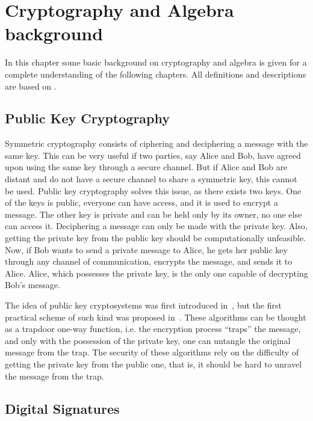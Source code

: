 \documentclass{ufsctex/ufsctex}
\begin{document}
\chapter{Cryptography and Algebra background}

In this chapter some basic background on cryptography and algebra is given for
a complete understanding of the following chapters. All definitions and
descriptions are based on \cite{stinson2005cryptography}.

\section{Public Key Cryptography}

Symmetric cryptography consists of ciphering and deciphering a message with the
same key. This can be very useful if two parties, say Alice and Bob, have
agreed upon using the same key through a secure channel. But if Alice and Bob
are distant and do not have a secure channel to share a symmetric key, this
cannot be used. Public key cryptography solves this issue, as there exists two
keys. One of the keys is public, everyone can have access, and it is used to
encrypt a message. The other key is private and can be held only by its owner,
no one else can access it. Deciphering a message can only be made with the
private key. Also, getting the private key from the public key should be
computationally unfeasible. Now, if Bob wants to send a private message to
Alice, he gets her public key through any channel of communication, encrypts
the message, and sends it to Alice. Alice, which possesses the private key, is
the only one capable of decrypting Bob's message.

The idea of public key cryptosystems was first introduced
in~\cite{diffie1976new}, but the first practical scheme of such kind was
proposed in~\cite{rivest1977digital}. These algorithms can be thought as a
trapdoor one-way function, i.e. the encryption process ``traps'' the message,
and only with the possession of the private key, one can untangle the original
message from the trap. The security of these algorithms rely on the difficulty
of getting the private key from the public one, that is, it should be hard to
unravel the message from the trap.

\section{Digital Signatures}
\end{document}
